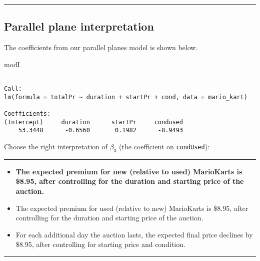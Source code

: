 \documentclass[]{book}
\newenvironment{Shaded}{\begin{snugshade}}{\end{snugshade}}
\newcommand{\NormalTok}[1]{#1}
\begin{document}
\hypertarget{htmlwidget-8a6c2d5675e6f40c5e57}{}

\begin{center}\rule{0.5\linewidth}{\linethickness}\end{center}

\subsection*{Parallel plane
interpretation}\label{parallel-plane-interpretation}

The coefficients from our parallel planes model is shown below.

\begin{Shaded}
\begin{Highlighting}[]
\NormalTok{modI}
\end{Highlighting}
\end{Shaded}

\begin{verbatim}

Call:
lm(formula = totalPr ~ duration + startPr + cond, data = mario_kart)

Coefficients:
(Intercept)     duration      startPr     condused  
    53.3448      -0.6560       0.1982      -8.9493  
\end{verbatim}

Choose the right interpretation of \(\beta_3\) (the coefficient on
\texttt{condUsed}):

\begin{center}\rule{0.5\linewidth}{\linethickness}\end{center}

\begin{itemize}
\item
  \textbf{The expected premium for new (relative to used) MarioKarts is
  \$8.95, after controlling for the duration and starting price of the
  auction.}
\item
  The expected premium for used (relative to new) MarioKarts is \$8.95,
  after controlling for the duration and starting price of the auction.
\item
  For each additional day the auction lasts, the expected final price
  declines by \$8.95, after controlling for starting price and
  condition.
\end{itemize}

\begin{center}\rule{0.5\linewidth}{\linethickness}\end{center}
\end{document}
